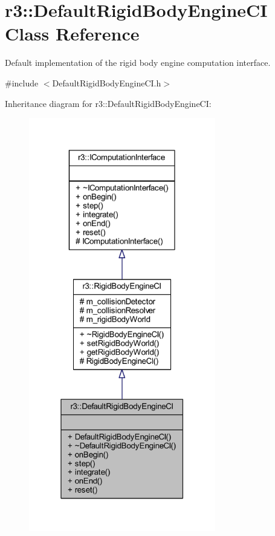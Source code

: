 \hypertarget{classr3_1_1_default_rigid_body_engine_c_i}{}\section{r3\+:\+:Default\+Rigid\+Body\+Engine\+CI Class Reference}
\label{classr3_1_1_default_rigid_body_engine_c_i}


Default implementation of the rigid body engine computation interface.  




{\ttfamily \#include $<$Default\+Rigid\+Body\+Engine\+C\+I.\+h$>$}



Inheritance diagram for r3\+:\+:Default\+Rigid\+Body\+Engine\+CI\+:\nopagebreak
\begin{figure}[H]
\begin{center}
\leavevmode
\includegraphics[width=231pt]{classr3_1_1_default_rigid_body_engine_c_i__inherit__graph}
\end{center}
\end{figure}


